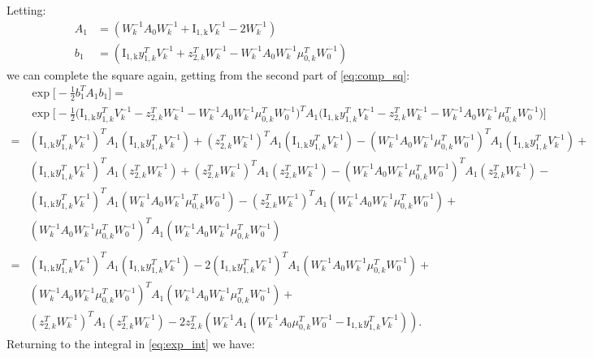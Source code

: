 \documentclass{standalone}
\newcommand{\yik}[1]{y_{#1, k}}
\newcommand{\zik}[1]{z_{#1, k}}
\newcommand{\mik}[1]{\mu_{#1, k}}
\newcommand{\Ik}[1]{\operatorname{I_{#1, k}}}
\newcommand{\ivk}[1]{V_{#1}^{-1}}
\newcommand{\iwk}[1]{W_{#1}^{-1}}
\begin{document}
Letting:
\begin{align*}
A_1 & = \left(\iwk{k}A_0 \iwk{k} + \Ik{1} \ivk{k} - 2 \iwk{k} \right) \\
b_1 & = \left(\Ik{1} \yik{1}^T \ivk{k} + \zik{2}^T \iwk{k} - \iwk{k}A_0\iwk{k}\mik{0}^T \iwk{0} \right)
\end{align*}
we can complete the square again, getting from the second part of \ref{eq:comp_sq}:
\begin{align*}
&\exp \bigg[-\frac{1}{2} b_1^T A_1 b_1 \bigg] = \\
&\exp \bigg[-\frac{1}{2} \bigg(\Ik{1} \yik{1}^T \ivk{k} - \zik{2}^T \iwk{k} - \iwk{k}A_0\iwk{k}\mik{0}^T \iwk{0} \bigg)^T A_1 \bigg(\Ik{1} \yik{1}^T \ivk{k} - \zik{2}^T \iwk{k} - \iwk{k}A_0\iwk{k}\mik{0}^T \iwk{0} \bigg) \bigg] \\
= &\left(\Ik{1} \yik{1}^T \ivk{k} \right)^T A_1 \left(\Ik{1} \yik{1}^T \ivk{k} \right) + \left(\zik{2}^T \iwk{k} \right)^T A_1 \left(\Ik{1} \yik{1}^T \ivk{k} \right) - \left(\iwk{k}A_0\iwk{k}\mik{0}^T \iwk{0} \right)^T A_1 \left(\Ik{1} \yik{1}^T \ivk{k} \right) + \\
& \left(\Ik{1} \yik{1}^T \ivk{k} \right)^T A_1 \left(\zik{2}^T \iwk{k} \right) + \left(\zik{2}^T \iwk{k} \right)^T A_1 \left(\zik{2}^T \iwk{k} \right) - \left(\iwk{k}A_0\iwk{k}\mik{0}^T \iwk{0} \right)^T A_1 \left(\zik{2}^T \iwk{k} \right) - \\
& \left(\Ik{1} \yik{1}^T \ivk{k} \right)^T A_1 \left(\iwk{k}A_0\iwk{k}\mik{0}^T \iwk{0} \right) - \left(\zik{2}^T \iwk{k} \right)^T A_1 \left(\iwk{k}A_0\iwk{k}\mik{0}^T \iwk{0} \right) + \\
& \left(\iwk{k}A_0\iwk{k}\mik{0}^T \iwk{0} \right)^T A_1 \left(\iwk{k}A_0\iwk{k}\mik{0}^T \iwk{0} \right)\\
& \\
= &\left(\Ik{1} \yik{1}^T \ivk{k} \right)^T A_1 \left(\Ik{1} \yik{1}^T \ivk{k} \right) - 2 \left(\Ik{1} \yik{1}^T \ivk{k} \right)^T A_1 \left(\iwk{k}A_0\iwk{k}\mik{0}^T \iwk{0} \right) + \\
& \left(\iwk{k}A_0\iwk{k}\mik{0}^T \iwk{0} \right)^T A_1 \left(\iwk{k}A_0\iwk{k}\mik{0}^T \iwk{0} \right) + \\
& \left(\zik{2}^T \iwk{k} \right)^T A_1 \left(\zik{2}^T \iwk{k} \right) - 2 \zik{2}^T \left(\iwk{k}A_1\left(\iwk{k}A_0\mik{0}^T\iwk{0} - \Ik{1} \yik{1}^T \ivk{k} \right) \right).
\end{align*}
Returning to the integral in \ref{eq:exp_int} we have:
\end{document}
